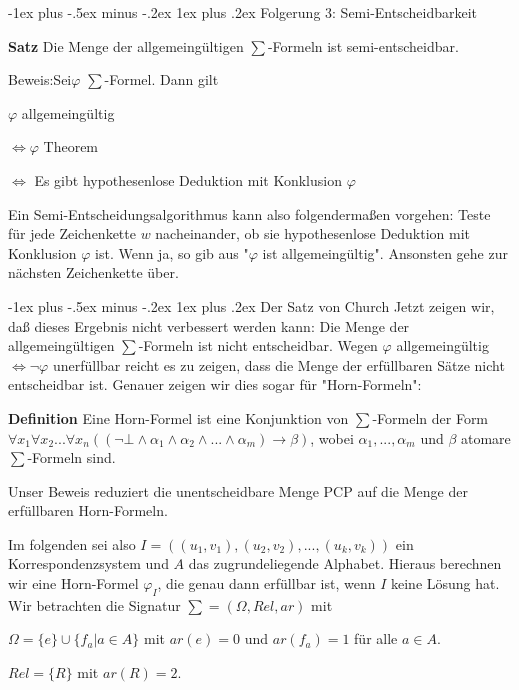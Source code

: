 \documentclass[a4paper]{article}
\makeatletter
\renewcommand{\note}[2]{\begin{noteBox} \textbf{#1} #2 \end{noteBox}}
\renewcommand{\subsubsection}{\@startsection{subsubsection}{3}{0mm}%
                {-1ex plus -.5ex minus -.2ex}%
                {1ex plus .2ex}%
                {\normalfont\small\bfseries}}
\makeatother
\begin{document}
\begin{multicols}{3}
  \subsubsection{Folgerung 3: Semi-Entscheidbarkeit}
  \note{Satz}{Die Menge der allgemeingültigen $\sum$-Formeln ist semi-entscheidbar.}

  Beweis:Sei$\varphi$ $\sum$-Formel. Dann gilt
  \begin{itemize*}
    \item $\varphi$ allgemeingültig
    \item $\Leftrightarrow \varphi$ Theorem
    \item $\Leftrightarrow$ Es gibt hypothesenlose Deduktion mit Konklusion $\varphi$
  \end{itemize*}

  Ein Semi-Entscheidungsalgorithmus kann also folgendermaßen vorgehen:
  Teste für jede Zeichenkette $w$ nacheinander, ob sie hypothesenlose Deduktion mit Konklusion $\varphi$ ist. Wenn ja, so gib aus "$\varphi$ ist allgemeingültig". Ansonsten gehe zur nächsten Zeichenkette über.

  \subsubsection{Der Satz von Church}
  Jetzt zeigen wir, daß dieses Ergebnis nicht verbessert werden kann: Die Menge der allgemeingültigen $\sum$-Formeln ist nicht entscheidbar.
  Wegen $\varphi$ allgemeingültig $\Leftrightarrow\lnot\varphi$ unerfüllbar reicht es zu zeigen, dass die Menge der erfüllbaren Sätze nicht entscheidbar ist.
  Genauer zeigen wir dies sogar für "Horn-Formeln":

  \note{Definition}{Eine Horn-Formel ist eine Konjunktion von $\sum$-Formeln der Form $\forall x_1 \forall x_2 ...\forall x_n((\lnot\bot \wedge\alpha_1\wedge\alpha_2\wedge...\wedge\alpha_m)\rightarrow\beta)$, wobei $\alpha_1,...,\alpha_m$ und $\beta$ atomare $\sum$-Formeln sind.}

  Unser Beweis reduziert die unentscheidbare Menge PCP auf die Menge der erfüllbaren Horn-Formeln.

  Im folgenden sei also $I=((u_1,v_1),(u_2,v_2),...,(u_k,v_k))$ ein Korrespondenzsystem und $A$ das zugrundeliegende Alphabet.
  Hieraus berechnen wir eine Horn-Formel $\varphi_I$, die genau dann erfüllbar ist, wenn $I$ keine Lösung hat.
  Wir betrachten die Signatur $\sum= (\Omega,Rel,ar)$ mit
  \begin{itemize*}
    \item $\Omega=\{e\}\cup\{f_a|a\in A\}$ mit $ar(e) =0$ und $ar(f_a) =1$ für alle $a\in A$.
    \item $Rel=\{R\}$ mit $ar(R)=2$.
  \end{itemize*}


\end{multicols}
\end{document}
